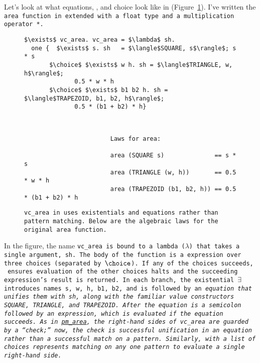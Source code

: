\documentclass[manuscript,screen,review, 12pt, nonacm]{acmart}
\begin{document}
    Let's look at what equations, \one, and choice look like in \VC
    (Figure~\ref{fig:versearea}). I've written the \tt{area} function in \VC
    extended with a \tt{float} type and a multiplication operator \tt{*}.

    \begin{figure}[]
        \verselst
        \begin{lstlisting}[numbers=none]
$\exists$ vc_area. vc_area = $\lambda$ sh. 
  one {  $\exists$ s. sh   = $\langle$SQUARE, s$\rangle$; s * s
       $\choice$ $\exists$ w h. sh = $\langle$TRIANGLE, w, h$\rangle$; 
              0.5 * w * h
       $\choice$ $\exists$ b1 b2 h. sh = $\langle$TRAPEZOID, b1, b2, h$\rangle$; 
              0.5 * (b1 + b2) * h}
        \end{lstlisting}

        \small
\begin{verbatim}


                        Laws for area: 
                        
                        area (SQUARE s)              == s * s 
                        area (TRIANGLE (w, h))       == 0.5 * w * h
                        area (TRAPEZOID (b1, b2, h)) == 0.5 * (b1 + b2) * h
        \end{verbatim}
    \caption{\tt{vc\_area} in \VC uses existentials and equations rather than
    pattern matching. Below are the algebraic laws for the original \tt{area}
    function.} 
    \label{fig:versearea}
    \end{figure}

    In the figure, the name \tt{vc\_area} is bound to a lambda ($\lambda$) that
    takes a single argument, \tt{sh}. The body of the function is a \one
    expression over three choices (separated by~$\choice$). If any of the
    choices succeeds, \one~ensures evaluation of the other choices halts and the
    succeeding expression's result is returned. In each branch, the existential
    $\exists$ introduces names \tt{s, w, h, b1, b2}, and is followed by an
    \it{equation} that unifies them with \tt{sh}, along with the familiar value
    constructors \tt{SQUARE}, \tt{TRIANGLE}, and~\tt{TRAPEZOID}. After the
    equation is a semicolon followed by an expression, which is evaluated if the
    equation succeeds. As in~\hyperref[fig:pmarea]{\tt{pm\_area}}, the
    right-hand sides of \tt{vc\_area} are \it{guarded} by a “check;” now, the
    check is successful unification in an equation rather than a successful
    match on a pattern. Similarly, \one with a list of choices represents
    matching on any \it{one} pattern to evaluate a single right-hand side. 
\end{document}
